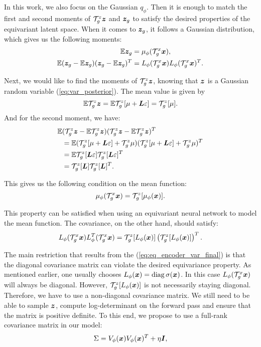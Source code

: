 In this work, we also focus on the Gaussian $q_{\phi}$. Then it is enough to match the first and second moments of ${\mathcal{T}}_g^z {\bm{z}}$ and ${\bm{z}}_g$ to satisfy the desired properties of the equivariant latent space. 
When it comes to ${\bm{z}}_g$, it follows a Gaussian distribution, which gives us the following moments: 
\begin{align}
    \mathbb{E} {\bm{z}}_g&= \mu_{\phi}({\mathcal{T}}_g^x {\bm{x}}), \\
    \mathbb{E}({\bm{z}}_g - \mathbb{E} {\bm{z}}_g) ({\bm{z}}_g - \mathbb{E} {\bm{z}}_g)^T &= L_{\phi}({\mathcal{T}}_g^x {\bm{x}})L_{\phi}({\mathcal{T}}_g^x {\bm{x}})^T.
\end{align}

Next, we would like to find the moments of ${\mathcal{T}}_g^z {\bm{z}}$, knowing that ${\bm{z}}$ is a Gaussian random variable (\ref{eq:var_posterior}). The mean value is given by
\begin{equation}
    \mathbb{E} {\mathcal{T}}_g^z {\bm{z}} = \mathbb{E} {\mathcal{T}}_g^z[\mu + {\bm{L}}\varepsilon] =  {\mathcal{T}}_g^z[\mu].
\end{equation}
And for the second moment, we have:
\begin{align}
    \mathbb{E} &({\mathcal{T}}_g^z {\bm{z}} - \mathbb{E}  {\mathcal{T}}_g^z {\bm{z}})({\mathcal{T}}_g^z {\bm{z}} - \mathbb{E}  {\mathcal{T}}_g^z {\bm{z}} )^T \\
    &=\mathbb{E} ({\mathcal{T}}_g^z[\mu + {\bm{L}}\varepsilon] + {\mathcal{T}}_g^z \mu)({\mathcal{T}}_g^z[\mu + {\bm{L}}\varepsilon] + {\mathcal{T}}_g^z\mu)^T \\
    &=\mathbb{E} {\mathcal{T}}_g^z[{\bm{L}}\varepsilon]{\mathcal{T}}_g^z[{\bm{L}}\varepsilon]^T \\
    &={\mathcal{T}}_g^z[{\bm{L}}]{\mathcal{T}}_g^z[{\bm{L}}]^T.
\end{align}

This gives us the following condition on the mean function:
\begin{equation}\label{eq:eq_encoder_mean_final}
     \mu_{\phi}(\gT_g^x \vx) = \gT_g^z[\mu_{\phi}(\vx)].
\end{equation}

This property can be satisfied when using an equivariant neural network to model the mean function. The covariance, on the other hand, should satisfy:
\begin{equation}\label{eq:eq_encoder_var_final}
    L_{\phi}(\gT_g^x \vx)L_{\phi}^T(\gT_g^x \vx) = \mathcal{T}_g^z[L_{\phi}(\vx)] \left(\gT_g^z[L_{\phi}(\vx)]\right)^T.
\end{equation}

The main restriction that results from the (\ref{eq:eq_encoder_var_final}) is that the diagonal covariance matrix can violate the desired equivariance property. As mentioned earlier, one usually chooses $L_{\phi}({\bm{x}}) = \operatorname{diag} \sigma({\bm{x}})$. In this case $L_{\phi}({\mathcal{T}}_g^x {\bm{x}})$ will always be diagonal. However, $\mathcal{T}_g^z[L_{\phi}({\bm{x}})]$ is not necessarily staying diagonal. Therefore, we have to use a non-diagonal covariance matrix. We still need to be able to sample ${\bm{z}}$, compute log-determinant on the forward pass and ensure that the matrix is positive definite. To this end, we propose to use a full-rank covariance matrix in our model:
\begin{equation}
    \Sigma = V_{\phi}({\bm{x}})V_{\phi}({\bm{x}})^T + \eta {\bm{I}},
\end{equation}


